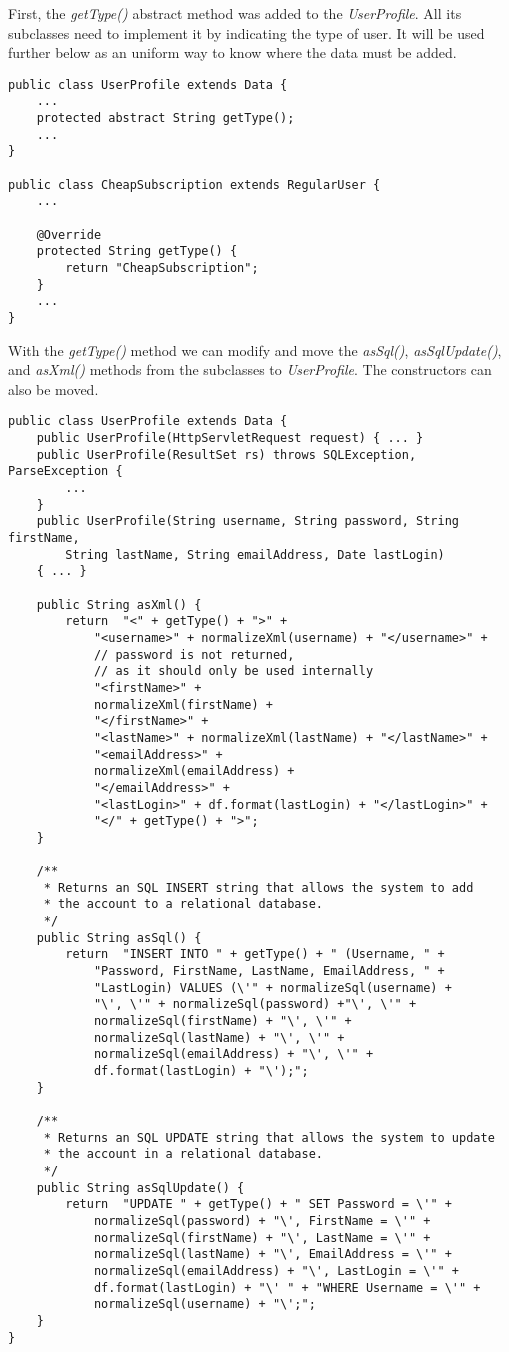 First, the \emph{getType()} abstract method was added to the \emph{UserProfile}.
All its subclasses need to implement it by indicating the type of user.
It will be used further below as an uniform way to know where the data must be
added.

\begin{lstlisting}
public class UserProfile extends Data {
    ...
    protected abstract String getType();
    ...
}

public class CheapSubscription extends RegularUser {
    ...
    
    @Override
	protected String getType() {
		return "CheapSubscription";
	}
    ...
}
\end{lstlisting}

With the \emph{getType()} method we can modify and move the \emph{asSql()},
\emph{asSqlUpdate()}, and \emph{asXml()} methods from the subclasses to
\emph{UserProfile}. The constructors can also be moved.

\begin{lstlisting}
public class UserProfile extends Data {
	public UserProfile(HttpServletRequest request) { ... }
    public UserProfile(ResultSet rs) throws SQLException, ParseException {
        ...
    }
    public UserProfile(String username, String password, String firstName,
		String lastName, String emailAddress, Date lastLogin)
    { ... }
        
    public String asXml() {
		return	"<" + getType() + ">" +
			"<username>" + normalizeXml(username) + "</username>" +
			// password is not returned,
			// as it should only be used internally
			"<firstName>" +
			normalizeXml(firstName) +
			"</firstName>" +
			"<lastName>" + normalizeXml(lastName) + "</lastName>" +
			"<emailAddress>" +
			normalizeXml(emailAddress) +
			"</emailAddress>" +
			"<lastLogin>" + df.format(lastLogin) + "</lastLogin>" +
			"</" + getType() + ">";
	}

	/**
	 * Returns an SQL INSERT string that allows the system to add
	 * the account to a relational database.
	 */
	public String asSql() {
		return	"INSERT INTO " + getType() + " (Username, " +
			"Password, FirstName, LastName, EmailAddress, " +
			"LastLogin) VALUES (\'" + normalizeSql(username) +
			"\', \'" + normalizeSql(password) +"\', \'" +
			normalizeSql(firstName) + "\', \'" +
			normalizeSql(lastName) + "\', \'" +
			normalizeSql(emailAddress) + "\', \'" +
			df.format(lastLogin) + "\');";
	}

	/**
	 * Returns an SQL UPDATE string that allows the system to update
	 * the account in a relational database.
	 */
	public String asSqlUpdate() {
		return  "UPDATE " + getType() + " SET Password = \'" +
			normalizeSql(password) + "\', FirstName = \'" +
			normalizeSql(firstName) + "\', LastName = \'" +
			normalizeSql(lastName) + "\', EmailAddress = \'" +
			normalizeSql(emailAddress) + "\', LastLogin = \'" +
			df.format(lastLogin) + "\' " + "WHERE Username = \'" +
			normalizeSql(username) + "\';";
	}
}
\end{lstlisting}

